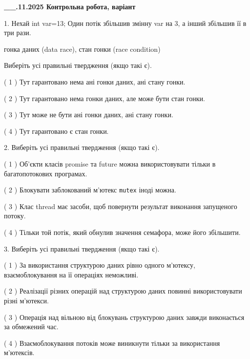 \documentclass[12pt, ukrainian]{article}
\def\code#1{\Verb!#1!}
\begin{document}
\newpage
\begin {large}

\textbf{\_\_.11.2025 Контрольна робота, варіант  }\par


{
1. Нехай int var=13; Один потік збільшив змінну var на 3, а інший збільшив її в три рази.

гонка даних (data race), стан гонки (race condition)

Виберіть усі правильні твердження (якщо такі є).\par
\vspace{2mm}
( 1 ) Тут гарантовано нема ані гонки даних, ані стану гонки.%

( 2 ) Тут гарантовано нема гонки даних, але може бути стан гонки.%

( 3 ) Тут може не бути ані гонки даних, ані стану гонки.%

( 4 ) Тут гарантовано є стан гонки.%


2. Виберіть усі правильні твердження (якщо такі є).\par
\vspace{2mm}

( 1 ) Об’єкти класів promise та future можна використовувати тільки в багатопотокових програмах.%

( 2 ) Блокувати заблокований м’ютекс  \code{mutex} іноді можна.%

( 3 ) Клас thread має засоби, щоб повернути результат виконання запущеного потоку.%

( 4 ) Тільки той потік, який обнулив значення семафора, може його збільшити.%


3. Виберіть усі правильні твердження (якщо такі є).\par
\vspace{2mm}

( 1 ) За використання структурою даних рівно одного м’ютексу, взаємоблокування на її операціях неможливі.%

( 2 ) Реалізації різних операцій над структурою даних повинні використовувати різні м’ютекси.%

( 3 ) Операція над вільною від блокувань структурою даних завжди виконається за обмежений час.%

( 4 ) Взаємоблокування потоків може виникнути тільки за використання м’ютексів.%


}
\end{large}
\end{document}
